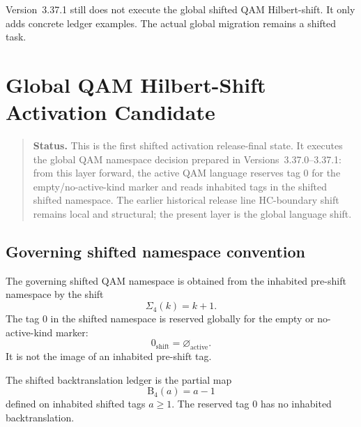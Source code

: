 \begin{remark}
\label{rem:v3371-non-claim}
Version~3.37.1 still does not execute the global shifted QAM Hilbert-shift. It only
adds concrete ledger examples. The actual global migration remains a shifted task.
\end{remark}



\clearpage
\section{Global QAM Hilbert-Shift Activation Candidate}
\label{sec:v400-r01-global-qam-hilbert-shift-activation}

\begin{quote}\small
\noindent\textbf{Status.}
This is the first shifted activation release-final state. It executes the global QAM
namespace decision prepared in Versions~3.37.0--3.37.1: from this layer
forward, the active QAM language reserves tag $0$ for the empty/no-active-kind
marker and reads inhabited tags in the shifted shifted namespace. The earlier
historical release line HC-boundary shift remains local and structural; the present layer is the
global language shift.
\end{quote}

\subsection{Governing shifted namespace convention}
\label{subsec:v400-r01-governing-shifted-namespace-convention}

\begin{definition}
\label{def:v400-r01-global-shifted-qam-hilbert-shift-convention}
The governing shifted QAM namespace is obtained from the inhabited pre-shift namespace
by the shift
\[
 \Sigma_4(k)=k+1.
\]
The tag $0$ in the shifted namespace is reserved globally for the empty or
no-active-kind marker:
\[
 0_{\mathrm{shift}}=\varnothing_{\mathrm{active}}.
\]
It is not the image of an inhabited pre-shift tag.
\end{definition}

\begin{definition}
\label{def:v400-r01-shifted-backtranslation-ledger}
The shifted backtranslation ledger is the partial map
\[
 \mathrm B_4(a)=a-1
\]
defined on inhabited shifted tags $a\geq 1$. The reserved tag $0$ has no inhabited
backtranslation.
\end{definition}

